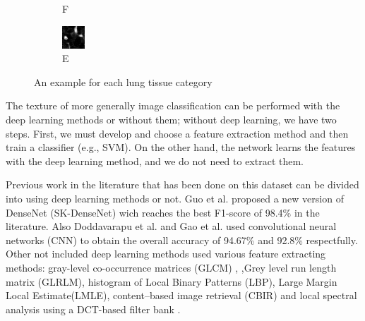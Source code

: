 \documentclass[conference]{IEEEtran}
\begin{document}
\begin{figure}[tbh]
\begin{subfigure}{0.092\textwidth}
    \caption{F}
  \end{subfigure}
  \centering
  \begin{subfigure}{0.092\textwidth}
    \centering
    \includegraphics[width=\linewidth]{images/emphysema.png}
    \caption{E}
  \end{subfigure}
 
  \caption{An example for each lung tissue category}
  \label{fig:texture_example}
\end{figure}



The texture of more generally image classification can be performed with the deep learning methods or without them; without deep learning, we have two steps. First, we must develop and choose a feature extraction method and then train a classifier (e.g., SVM). On the other hand, the network learns the features with the deep learning method, and we do not need to extract them. 


Previous work in the literature that has been done on this dataset can be divided into using deep learning methods or not.
Guo et al. \cite{Fscore984} proposed a new version of DenseNet (SK-DenseNet) wich reaches the best F1-score of 98.4\% in the literature. Also Doddavarapu et al. \cite{acc9467} and Gao et al.\cite{acc928} used convolutional neural networks (CNN) to obtain the overall accuracy of 94.67\% and 92.8\% respectfully. Other not included deep learning methods used various feature extracting methods: gray-level co-occurrence matrices (GLCM) \cite{acc934},\cite{GLCM2} ,Grey level run length matrix (GLRLM)\cite{acc934}, histogram of Local Binary Patterns (LBP)\cite{acc934}, Large Margin Local Estimate(LMLE)\cite{acc861}, content–based image retrieval (CBIR) \cite{acc86} and local spectral analysis using a DCT-based filter bank \cite{Fscore89}.
\end{document}

